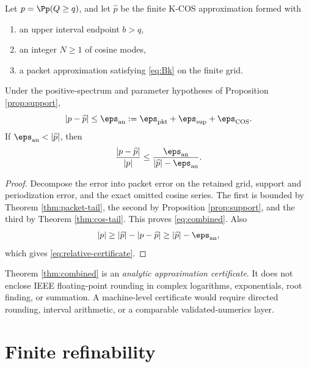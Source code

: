 \begin{theorem}
\label{thm:combined}
Let $p=\Pp(Q\ge q)$, and let $\widehat p$ be the finite K-COS approximation formed with
\begin{enumerate}[label=(\roman*)]
\item an upper interval endpoint $b>q$,
\item an integer $N\ge1$ of cosine modes,
\item a packet approximation satisfying \eqref{eq:Bk} on the finite grid.
\end{enumerate}
Under the positive-spectrum and parameter hypotheses of Proposition \ref{prop:support},
\begin{equation}
|p-\widehat p|
\le
\eps_{\mathrm{an}}
:=\eps_{\mathrm{pkt}}+\eps_{\mathrm{sup}}+\eps_{\mathrm{COS}}.
\label{eq:combined}
\end{equation}
If $\eps_{\mathrm{an}}<|\widehat p|$, then
\begin{equation}
\frac{|p-\widehat p|}{|p|}
\le
\frac{\eps_{\mathrm{an}}}
{|\widehat p|-\eps_{\mathrm{an}}}.
\label{eq:relative-certificate}
\end{equation}
\end{theorem}

\begin{proof}
Decompose the error into packet error on the retained grid, support and periodization error, and the exact omitted cosine series. The first is bounded by Theorem \ref{thm:packet-tail}, the second by Proposition \ref{prop:support}, and the third by Theorem \ref{thm:cos-tail}. This proves \eqref{eq:combined}. Also
\[
|p|\ge |\widehat p|-|p-\widehat p|
\ge |\widehat p|-\eps_{\mathrm{an}},
\]
which gives \eqref{eq:relative-certificate}.
\end{proof}

\begin{remark}\label{claim:final-26-12}
Theorem \ref{thm:combined} is an \emph{analytic approximation certificate}. It does not enclose IEEE floating-point rounding in complex logarithms, exponentials, root finding, or summation. A machine-level certificate would require directed rounding, interval arithmetic, or a comparable validated-numerics layer.
\end{remark}

\section{Finite refinability}

